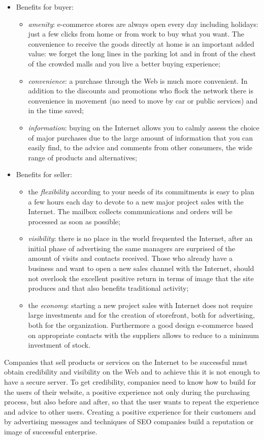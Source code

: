 \begin{itemize}
  \item Benefits for buyer:
  \begin{itemize}
    \item \emph{amenity}: e-commerce stores are always open every day including holidays: just a few clicks from home or from work to buy what you want. The convenience to receive the goods directly at home is an important added value: we forget the long lines in the parking lot and in front of the chest of the crowded malls and you live a better buying experience;
    \item \emph{convenience}: a purchase through the Web is much more convenient. In addition to the discounts and promotions who flock the network there is convenience in movement (no need to move by car or public services) and in the time saved;
    \item \emph{information}: buying on the Internet allows you to calmly assess the choice of major purchases due to the large amount of information that you can easily find, to the advice and comments from other consumers, the wide range of products and alternatives;
  \end{itemize}
  \item Benefits for seller:
    \begin{itemize}
    \item the \emph{flexibility} according to your needs of its commitments is easy to plan a few hours each day to devote to a new major project sales with the Internet. The mailbox collects communications and orders will be processed as soon as possible;
    \item \emph{visibility}: there is no place in the world frequented the Internet, after an initial phase of advertising the same managers are surprised of the amount of visits and contacts received. Those who already have a business and want to open a new sales channel with the Internet, should not overlook the excellent positive return in terms of image that the site produces and that also benefits traditional activity;
    \item the \emph{economy}: starting a new project sales with Internet does not require large investments and for the creation of storefront, both for advertising, both for the organization. Furthermore a good design e-commerce based on appropriate contacts with the suppliers allows to reduce to a minimum investment of stock.
  \end{itemize}
\end{itemize}
Companies that sell products or services on the Internet to be successful must obtain credibility and visibility on the Web and to achieve this it is not enough to have a secure server. To get credibility, companies need to know how to build for the users of their website, a positive experience not only during the purchasing process, but also before and after, so that the user wants to repeat the experience and advice to other users. Creating a positive experience for their customers and by advertising messages and techniques of SEO companies build a reputation or image of successful enterprise.
